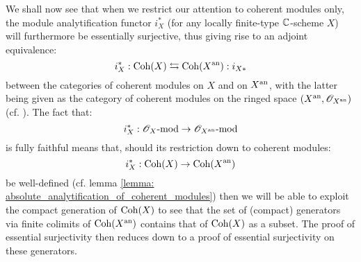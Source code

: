             We shall now see that when we restrict our attention to coherent modules only, the module analytification functor $i_X^*$ (for any locally finite-type $\mathbb{C}$-scheme $X$) will furthermore be essentially surjective, thus giving rise to an adjoint equivalence:
                $$i_X^*: \mathrm{Coh}(X) \leftrightarrows \mathrm{Coh}(X^{\mathrm{an}}): i_{X *}$$
            between the categories of coherent modules on $X$ and on $X^{\mathrm{an}}$, with the latter being given as the category of coherent modules on the ringed space $(X^{\mathrm{an}}, \mathscr{O}_{X^{\mathrm{an}}})$ (cf. \cite[\href{https://stacks.math.columbia.edu/tag/01BU}{Tag 01BU}]{stacks}). The fact that:
                $$i_X^*: \mathscr{O}_X\text{-}\mathrm{mod} \to \mathscr{O}_{X^{\mathrm{an}}}\text{-}\mathrm{mod}$$
            is fully faithful means that, should its restriction down to coherent modules:
               $$i_X^*: \mathrm{Coh}(X) \to \mathrm{Coh}(X^{\mathrm{an}})$$
           be well-defined (cf. lemma \ref{lemma: absolute_analytification_of_coherent_modules}) then we will be able to exploit the compact generation of $\mathrm{Coh}(X)$ to see that the set of (compact) generators via finite colimits of $\mathrm{Coh}(X^{\mathrm{an}})$ contains that of $\mathrm{Coh}(X)$ as a subset. The proof of essential surjectivity then reduces down to a proof of essential surjectivity on these generators. 
